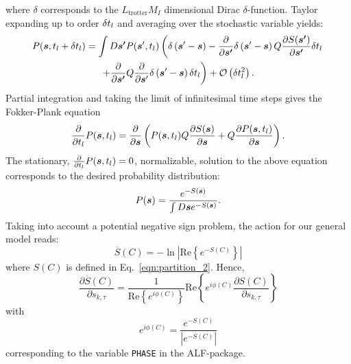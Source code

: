 where $\delta$ corresponds to the $L_\mathrm{trotter} M_I $ dimensional Dirac $\delta$-function.   Taylor expanding  up to order $\delta t_{l}$  and averaging over the stochastic variable yields:
\begin{multline}
P(\boldsymbol{s}, t_{l}  + \delta t_{l} ) = \int D\boldsymbol{s'}  P  (\boldsymbol{s}', t_{l}  )   \left(   \delta \left(  \boldsymbol{s}' - \boldsymbol{s}   \right)
-   \frac{\partial  }{\partial    \boldsymbol{s'} } \delta \left(  \boldsymbol{s}' - \boldsymbol{s} \right) Q \frac{\partial S(\boldsymbol{s'}) }{\partial    \boldsymbol{s'} }  \delta t_{l}   \right.  \\
   \left. + \frac{\partial  }{\partial    \boldsymbol{s'} } Q  \frac{\partial  }{\partial    \boldsymbol{s}' }  \delta \left(  \boldsymbol{s}' - \boldsymbol{s}\right)    \delta t_{l}
\right)  + {\cal O}  \left(  \delta t_{l}^2 \right).
\end{multline}
Partial integration  and taking the limit of infinitesimal time steps   gives the Fokker-Plank equation
\begin{equation}
         \frac{\partial  }{\partial   t_{l}}  P( \boldsymbol{s}, t_{l})  =  \frac{\partial  }{\partial    \boldsymbol{s} }  \left( P( \boldsymbol{s}, t_{l})  Q\frac{\partial S(\boldsymbol{s}) }{\partial     \boldsymbol{s} }   +
        Q  \frac{\partial P(\boldsymbol{s},t_{l}) }{\partial     \boldsymbol{s} }
         \right) .
\end{equation}
The stationary,  $ \frac{\partial  }{\partial   t_{l}}  P( \boldsymbol{s}, t_{l}) =0$,  normalizable,  solution to the above equation corresponds to the desired probability distribution:
\begin{equation}\label{eqn:langevin_solution}
          P(\boldsymbol{s}) =  \frac{ e^{ - S(\boldsymbol{s}) } }   {   \int D \boldsymbol{s}  e^{ - S(\boldsymbol{s}) } }.
\end{equation}
Taking into account a potential negative sign problem, the action   for our general model reads:
\begin{equation}
	\overline{S}(C)   = -  \ln \left|  \text{Re} \left\{  e^{-S(C)} \right\} \right| 
\end{equation}
where  $S(C) $  is defined in Eq.~\eqref{eqn:partition_2}. Hence, 
\begin{equation}
   \frac{ \partial{\overline{S}(C)}} {\partial s_{k,\tau} }    =   \frac{1}{\text{Re} \left\{e^{i \phi(C)}\right\} } \text{Re} \left\{  e^{i\phi(C)}\frac{ \partial S (C)} {\partial s_{k,\tau} }   \right\}
\end{equation}
with
\begin{equation}
	e^{i \phi(C)}  =   \frac{e^{- S(C)}}{| e^{-S(C)}  |}
\end{equation}
corresponding to the variable \texttt{PHASE}  in the ALF-package. 

